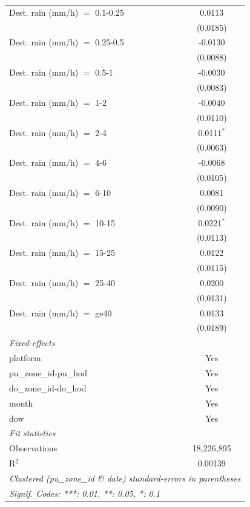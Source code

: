 \begin{tabular}{lc}
   Dest. rain (mm/h) $=$ 0.1-0.25  & 0.0113\\   
                                   & (0.0185)\\   
   Dest. rain (mm/h) $=$ 0.25-0.5  & -0.0130\\   
                                   & (0.0088)\\   
   Dest. rain (mm/h) $=$ 0.5-1     & -0.0030\\   
                                   & (0.0083)\\   
   Dest. rain (mm/h) $=$ 1-2       & -0.0040\\   
                                   & (0.0110)\\   
   Dest. rain (mm/h) $=$ 2-4       & 0.0111$^{*}$\\   
                                   & (0.0063)\\   
   Dest. rain (mm/h) $=$ 4-6       & -0.0068\\   
                                   & (0.0105)\\   
   Dest. rain (mm/h) $=$ 6-10      & 0.0081\\   
                                   & (0.0090)\\   
   Dest. rain (mm/h) $=$ 10-15     & 0.0221$^{*}$\\   
                                   & (0.0113)\\   
   Dest. rain (mm/h) $=$ 15-25     & 0.0122\\   
                                   & (0.0115)\\   
   Dest. rain (mm/h) $=$ 25-40     & 0.0200\\   
                                   & (0.0131)\\   
   Dest. rain (mm/h) $=$ ge40      & 0.0133\\   
                                   & (0.0189)\\   
   \midrule
   \emph{Fixed-effects}\\
   platform                        & Yes\\  
   pu\_zone\_id-pu\_hod            & Yes\\  
   do\_zone\_id-do\_hod            & Yes\\  
   month                           & Yes\\  
   dow                             & Yes\\  
   \midrule
   \emph{Fit statistics}\\
   Observations                    & 18,226,895\\  
   R$^2$                           & 0.00139\\  
   \midrule \midrule
   \multicolumn{2}{l}{\emph{Clustered (pu\_zone\_id \& date) standard-errors in parentheses}}\\
   \multicolumn{2}{l}{\emph{Signif. Codes: ***: 0.01, **: 0.05, *: 0.1}}\\
\end{tabular}
 
